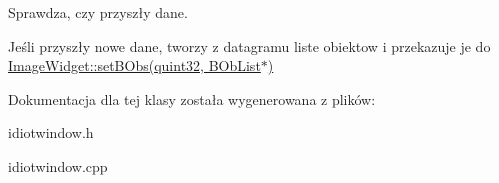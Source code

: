 Sprawdza, czy przyszły dane. 

Jeśli przyszły nowe dane, tworzy z datagramu liste obiektow i przekazuje je do \hyperlink{class_image_widget_a86269777fd7075bc223a5c8e011252b}{ImageWidget::setBObs(quint32, BObList$\ast$)} 

Dokumentacja dla tej klasy została wygenerowana z plików:\begin{CompactItemize}
\item 
idiotwindow.h\item 
idiotwindow.cpp\end{CompactItemize}
